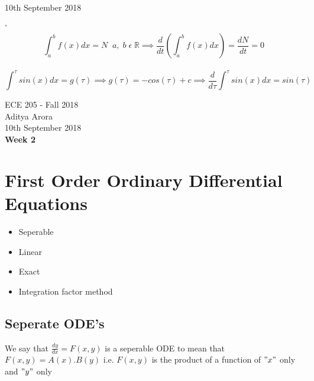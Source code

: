 \documentclass[11pt]{article}
\theoremstyle{definition}
\newcommand{\R}{\mathbb{R}}
\begin{document}
\begin{center}
    {\LARGE 10th September 2018}
\end{center}'
$$\int_a^bf(x)dx = N\;\; a,\;b\; \epsilon\; \R \implies \frac{d}{dt}(\int_a^bf(x)dx) = \frac{dN}{dt} = 0$$
\\
$$\int^\tau sin(x)dx = g(\tau) \implies g(\tau) = -cos(\tau) + c \implies \frac{d}{d\tau} \int^\tau sin(x)dx = sin(\tau)$$


\newpage
\begin{center}
{\LARGE ECE 205 - Fall 2018 \\ Aditya Arora\\ \vspace{5mm} 10th September 2018}\\
{\vspace{5mm} \LARGE \bf Week 2}

\end{center}

\section{First Order Ordinary Differential Equations}
\begin{itemize}
    \item Seperable
    \item Linear
    \item Exact
    \item Integration factor method
\end{itemize}

\subsection{Seperate ODE's}
We say that $\frac{dy}{dx} = F(x, y)$ is a seperable ODE to mean that $F(x, y) = A(x).B(y)$ i.e. $F(x,y)$ is the product of a function of $"x"$ only and $"y"$ only\\
\end{document}
